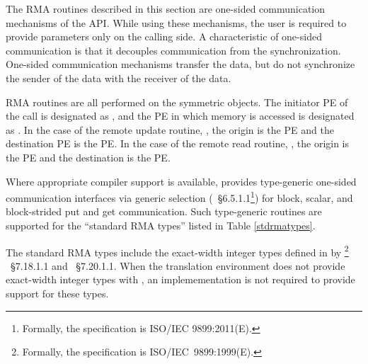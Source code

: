 The \ac{RMA} routines described in this section are one-sided communication
mechanisms of the \openshmem \ac{API}. While using these mechanisms, the user
is required to provide parameters only on the calling side. A characteristic of
one-sided communication is that it decouples communication from the
synchronization. One-sided communication mechanisms transfer the data, but do not
synchronize the sender of the data with the receiver of the data. 

\openshmem \ac{RMA} routines are all performed on the symmetric objects.  The
initiator \ac{PE} of the call is designated as \source{}, and the \ac{PE} in
which memory is accessed is designated as \dest{}. In the case of the remote
update routine, \PUT{}, the origin is the \source{} \ac{PE} and the destination
\ac{PE} is the \dest{} PE. In the case of the remote read routine, \GET{}, the
origin is the \dest{} \ac{PE} and the destination is the \source{} \ac{PE}.

Where appropriate compiler support is available, \openshmem provides type-generic 
one-sided communication interfaces via \Cstd[11] generic selection
(\Cstd[11]~\S6.5.1.1\footnote{Formally, the \Cstd[11] specification is ISO/IEC 9899:2011(E).})
for block, scalar, and block-strided put and get communication. 
Such type-generic routines are supported for the ``standard \ac{RMA} types''
listed in Table \ref{stdrmatypes}.

The standard \ac{RMA} types include the exact-width integer types defined in
 by \Cstd[99]%
\footnote{Formally, the \Cstd[99] specification is ISO/IEC~9899:1999(E).}%
~\S7.18.1.1 and \Cstd[11]~\S7.20.1.1. When the \Cstd translation environment
does not provide exact-width integer types with , an
\openshmem implemementation is not required to provide support for these types.

